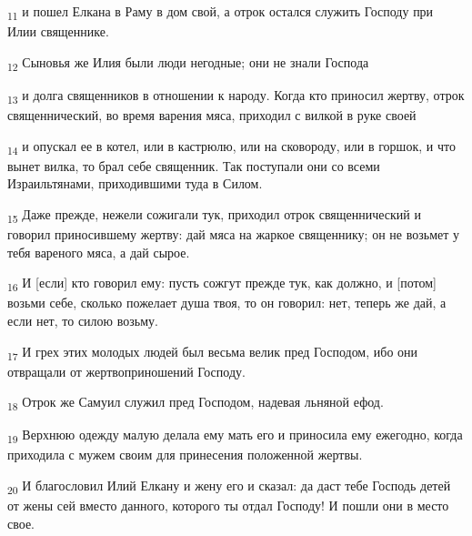 \begin{tcolorbox}
\textsubscript{11} и пошел Елкана в Раму в дом свой, а отрок остался служить Господу при Илии священнике.
\end{tcolorbox}
\begin{tcolorbox}
\textsubscript{12} Сыновья же Илия были люди негодные; они не знали Господа
\end{tcolorbox}
\begin{tcolorbox}
\textsubscript{13} и долга священников в отношении к народу. Когда кто приносил жертву, отрок священнический, во время варения мяса, приходил с вилкой в руке своей
\end{tcolorbox}
\begin{tcolorbox}
\textsubscript{14} и опускал ее в котел, или в кастрюлю, или на сковороду, или в горшок, и что вынет вилка, то брал себе священник. Так поступали они со всеми Израильтянами, приходившими туда в Силом.
\end{tcolorbox}
\begin{tcolorbox}
\textsubscript{15} Даже прежде, нежели сожигали тук, приходил отрок священнический и говорил приносившему жертву: дай мяса на жаркое священнику; он не возьмет у тебя вареного мяса, а дай сырое.
\end{tcolorbox}
\begin{tcolorbox}
\textsubscript{16} И [если] кто говорил ему: пусть сожгут прежде тук, как должно, и [потом] возьми себе, сколько пожелает душа твоя, то он говорил: нет, теперь же дай, а если нет, то силою возьму.
\end{tcolorbox}
\begin{tcolorbox}
\textsubscript{17} И грех этих молодых людей был весьма велик пред Господом, ибо они отвращали от жертвоприношений Господу.
\end{tcolorbox}
\begin{tcolorbox}
\textsubscript{18} Отрок же Самуил служил пред Господом, надевая льняной ефод.
\end{tcolorbox}
\begin{tcolorbox}
\textsubscript{19} Верхнюю одежду малую делала ему мать его и приносила ему ежегодно, когда приходила с мужем своим для принесения положенной жертвы.
\end{tcolorbox}
\begin{tcolorbox}
\textsubscript{20} И благословил Илий Елкану и жену его и сказал: да даст тебе Господь детей от жены сей вместо данного, которого ты отдал Господу! И пошли они в место свое.
\end{tcolorbox}
